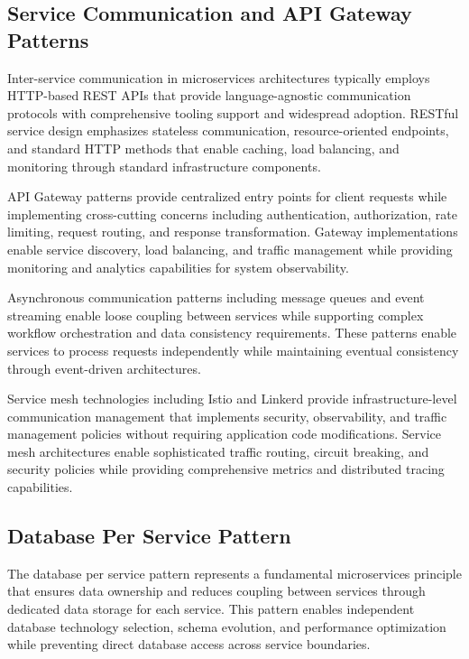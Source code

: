 \subsection{Service Communication and API Gateway Patterns}

Inter-service communication in microservices architectures typically employs HTTP-based REST APIs that provide language-agnostic communication protocols with comprehensive tooling support and widespread adoption. RESTful service design emphasizes stateless communication, resource-oriented endpoints, and standard HTTP methods that enable caching, load balancing, and monitoring through standard infrastructure components.

API Gateway patterns provide centralized entry points for client requests while implementing cross-cutting concerns including authentication, authorization, rate limiting, request routing, and response transformation. Gateway implementations enable service discovery, load balancing, and traffic management while providing monitoring and analytics capabilities for system observability.

Asynchronous communication patterns including message queues and event streaming enable loose coupling between services while supporting complex workflow orchestration and data consistency requirements. These patterns enable services to process requests independently while maintaining eventual consistency through event-driven architectures.

Service mesh technologies including Istio and Linkerd provide infrastructure-level communication management that implements security, observability, and traffic management policies without requiring application code modifications. Service mesh architectures enable sophisticated traffic routing, circuit breaking, and security policies while providing comprehensive metrics and distributed tracing capabilities.

\subsection{Database Per Service Pattern}

The database per service pattern represents a fundamental microservices principle that ensures data ownership and reduces coupling between services through dedicated data storage for each service. This pattern enables independent database technology selection, schema evolution, and performance optimization while preventing direct database access across service boundaries.

